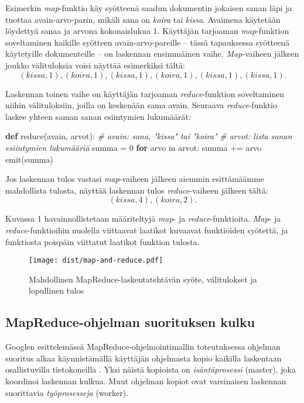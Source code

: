 \documentclass[finnish]{templates/tktltiki2}
\newenvironment{Shaded}{}{}
\newcommand{\KeywordTok}[1]{\textcolor[rgb]{0.00,0.44,0.13}{\textbf{{#1}}}}
\newcommand{\DataTypeTok}[1]{\textcolor[rgb]{0.56,0.13,0.00}{{#1}}}
\newcommand{\DecValTok}[1]{\textcolor[rgb]{0.25,0.63,0.44}{{#1}}}
\newcommand{\CommentTok}[1]{\textcolor[rgb]{0.38,0.63,0.69}{\textit{{#1}}}}
\newcommand{\NormalTok}[1]{{#1}}
\theoremstyle{definition}
\theoremstyle{remark}
\begin{document}
Esimerkin \emph{map}-funktio käy syötteenä saadun dokumentin jokaisen
sanan läpi ja tuottaa avain-arvo-parin, mikäli sana on \emph{koira} tai
\emph{kissa}. Avaimena käytetään löydettyä sanaa ja arvona kokonaislukua
\(1\). Käyttäjän tarjoaman \emph{map}-funktion soveltaminen kaikille
syötteen avain-arvo-pareille -- tässä tapauksessa syötteenä käytetyille
dokumenteille -- on laskennan ensimmäinen vaihe. \emph{Map}-vaiheen
jälkeen joukko välituloksia voisi näyttää esimerkiksi tältä: \[
(kissa, 1), (koira, 1), (kissa, 1), (koira, 1), (kissa, 1), (kissa, 1).
\]

Laskennan toinen vaihe on käyttäjän tarjoaman \emph{reduce}-funktion
soveltaminen niihin välituloksiin, joilla on keskenään sama avain.
Seuraava \emph{reduce}-funktio laskee yhteen saman sanan esiintymien
lukumäärät:

\begin{Shaded}
\begin{Highlighting}[]
\KeywordTok{def} \DataTypeTok{reduce}\NormalTok{(avain, arvot):}
    \CommentTok{# avain: sana, "kissa" tai "koira"}
    \CommentTok{# arvot: lista sanan esiintymien lukumääriä}
    \NormalTok{summa = }\DecValTok{0}
    \KeywordTok{for} \NormalTok{arvo in arvot:}
        \NormalTok{summa += arvo}
    \NormalTok{emit(summa)}
\end{Highlighting}
\end{Shaded}

Jos laskennan tulos vastasi \emph{map}-vaiheen jälkeen aiemmin
esittämäämme mahdollista tulosta, näyttää laskennan tulos
\emph{reduce}-vaiheen jälkeen tältä: \[
(kissa, 4), (koira, 2).
\]

Kuvassa 1 havainnollistetaan määriteltyjä \emph{map}- ja
\emph{reduce}-funktioita. \emph{Map}- ja \emph{reduce}-funktioihin
nuolella viittaavat laatikot kuvaavat funktioiden syötettä, ja
funktiosta poispäin viittatut laatikot funktion tulosta.

\begin{figure}[!b]
\centering
\texttt{[image: dist/map-and-reduce.pdf]}
\caption{Mahdollinen MapReduce-laskentatehtävän syöte, välitulokset ja
lopullinen tulos}
\end{figure}

\subsection{MapReduce-ohjelman suorituksen
kulku}\label{mapreduce-ohjelman-suorituksen-kulku}

Googlen esittelemässä MapReduce-ohjelmointimallin toteutuksessa ohjelman
suoritus alkaa käynnistämällä käyttäjän ohjelmasta kopio kaikilla
laskentaan osallistuvilla tietokoneilla \cite{mapreduce}. Yksi
näistä kopioista on \emph{isäntäprosessi} (master), joka koordinoi
laskennan kulkua. Muut ohjelman kopiot ovat varsinaisen laskennan
suorittavia \emph{työprosesseja} (worker).
\end{document}
